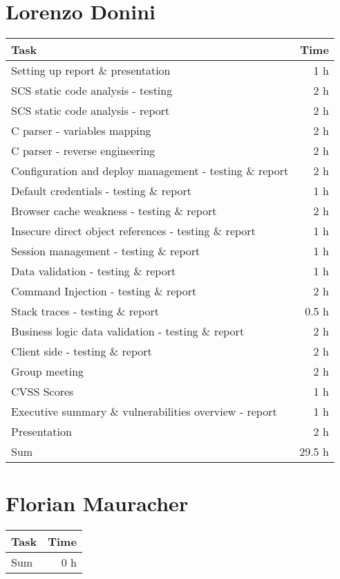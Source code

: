 \clearpage
\section*{Lorenzo Donini}
\begin{table}[h!tpb]
  \centering
  \begin{tabularx}{\textwidth}{X r}
    \toprule
      Task & Time \\
    \midrule
      Setting up report \& presentation & 1 h \\
      SCS static code analysis - testing & 2 h \\
      SCS static code analysis - report & 2 h \\
      C parser - variables mapping & 2 h \\
      C parser - reverse engineering & 2 h \\
      Configuration and deploy management - testing \& report & 2 h \\
      Default credentials - testing \& report & 1 h \\
      Browser cache weakness - testing \& report & 2 h \\
      Insecure direct object references - testing \& report & 1 h \\
      Session management - testing \& report & 1 h \\
      Data validation - testing \& report & 1 h \\
      Command Injection - testing \& report & 2 h \\
      Stack traces - testing \& report & 0.5 h \\
      Business logic data validation - testing \& report & 2 h \\
      Client side - testing \& report & 2 h \\
      Group meeting & 2 h \\
      CVSS Scores & 1 h \\
      Executive summary \& vulnerabilities overview - report & 1 h \\
      Presentation & 2 h \\
    \midrule
      Sum & 29.5 h \\
    \bottomrule
  \end{tabularx}
\end{table}

\clearpage
\section*{Florian Mauracher}
\begin{table}[h!tpb]
  \centering
  \begin{tabularx}{\textwidth}{X r}
    \toprule
      Task & Time \\
    \midrule
    \midrule
      Sum & 0 h \\
    \bottomrule
  \end{tabularx}
\end{table}

